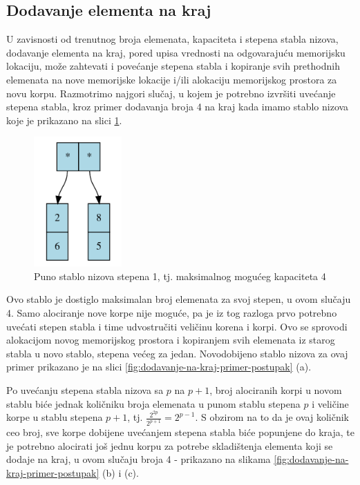 \documentclass[a4paper]{article}
\begin{document}
\subsection{Dodavanje elementa na kraj}
\label{subsec:dodavanje-elementa-na-kraj}

U zavisnosti od trenutnog broja elemenata, kapaciteta i stepena stabla nizova, dodavanje elementa na kraj, pored upisa vrednosti na odgovarajuću memorijsku lokaciju, može zahtevati i povećanje stepena stabla i kopiranje svih prethodnih elemenata na nove memorijske lokacije i/ili alokaciju memorijskog prostora za novu korpu. Razmotrimo najgori slučaj, u kojem je potrebno izvršiti uvećanje stepena stabla, kroz primer dodavanja broja 4 na kraj kada imamo stablo nizova koje je prikazano na slici \ref{fig:dodavanje-na-kraj-primer-pocetak}.

\begin{figure}[h!]
    \centering
    \includegraphics[width=0.3\textwidth]{ilustracije/dodavanje-na-kraj-primer-1.png}
    \caption{Puno stablo nizova stepena 1, tj. maksimalnog mogućeg kapaciteta 4}
    \label{fig:dodavanje-na-kraj-primer-pocetak}
\end{figure}

Ovo stablo je dostiglo maksimalan broj elemenata za svoj stepen, u ovom slučaju 4. Samo alociranje nove korpe nije moguće, pa je iz tog razloga prvo potrebno uvećati stepen stabla i time udvostručiti veličinu korena i korpi. Ovo se sprovodi alokacijom novog memorijskog prostora i kopiranjem svih elemenata iz starog stabla u novo stablo, stepena većeg za jedan. Novodobijeno stablo nizova za ovaj primer prikazano je na slici \ref{fig:dodavanje-na-kraj-primer-postupak} (a).

Po uvećanju stepena stabla nizova sa $p$ na $p + 1$, broj alociranih korpi u novom stablu biće jednak količniku broja elemenata u punom stablu stepena $p$ i veličine korpe u stablu stepena $p + 1$, tj. $\frac{2^{2p}}{2^{p + 1}} = 2^{p - 1}$. S obzirom na to da je ovaj količnik ceo broj, sve korpe dobijene uvećanjem stepena stabla biće popunjene do kraja, te je potrebno alocirati još jednu korpu za potrebe skladištenja elementa koji se dodaje na kraj, u ovom slučaju broja 4 - prikazano na slikama \ref{fig:dodavanje-na-kraj-primer-postupak} (b) i (c).
\end{document}
